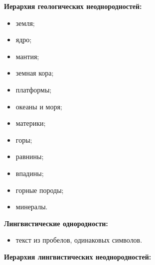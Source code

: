 \textbf{Иерархия геологических неоднородностей:}


\begin{itemize}


\item земля;\\[-14pt]


\item ядро;\\[-14pt]


\item мантия;\\[-14pt]


\item земная кора;\\[-14pt]


\item платформы;\\[-14pt]


\item океаны и моря;\\[-14pt]


\item материки;\\[-14pt]


\item горы;\\[-14pt]


\item равнины;\\[-14pt]


\item впадины;\\[-14pt]


\item горные породы;\\[-14pt]


\item минералы.


\end{itemize}





\textbf{Лингвистические однородности:}


\begin{itemize}


\item текст из пробелов, одинаковых символов.


\end{itemize}





\textbf{Иерархия лингвистических неоднородностей:}


